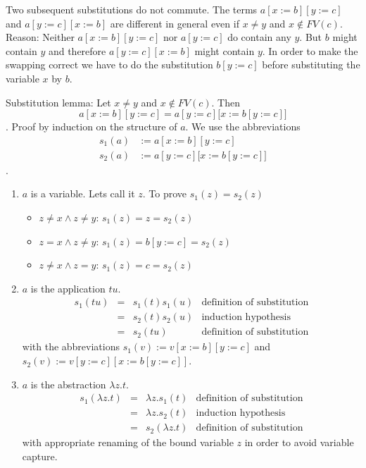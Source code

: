 \documentclass{article}
\begin{document}
Two subsequent substitutions do not commute. The terms $a[x:=b][y:=c]$ and
$a[y:=c][x:=b]$ are different in general even if $x \ne y$ and
$x \notin FV(c)$. Reason: Neither $a[x:=b][y:=c]$ nor $a[y:=c]$ do contain any
$y$. But $b$ might contain $y$ and therefore $a[y:=c][x:=b]$ might contain
$y$. In order to make the swapping correct we have to do the substitution
$b[y:=c]$ before substituting the variable $x$ by $b$.

\begin{theorem} Substitution lemma: Let $x \ne y$ and $x \notin
  FV(c)$. Then $$a[x:=b][y:=c] = a[y:=c]\big[x:= b[y:=c]\big]$$. Proof by
  induction on the structure of $a$. We use the abbreviations
  $$\begin{array}{ll}
      s_1(a) &:= a[x:=b][y:=c] \\
      s_2(a) &:= a[y:=c]\big[x:=b[y:=c]\big]
    \end{array}$$.
  \begin{enumerate}
  \item $a$ is a variable. Lets call it $z$. To prove $s_1(z) = s_2(z)$
    \begin{itemize}
    \item $z \ne x \land z \ne y$: $s_1(z) = z = s_2(z)$
    \item $z = x \land z \ne y$: $s_1(z) = b[y:=c] = s_2(z)$
    \item $z \ne x \land z = y$: $s_1(z) = c = s_2(z)$
    \end{itemize}
  \item $a$ is the application $t u$.
    $$\begin{array}{llll}
        s_1(t u) &=& s_1(t) s_1(u) & \text{definition of substitution}\\
       &=& s_2(t) s_2(u) & \text{induction hypothesis}\\
        &=& s_2(t u) & \text{definition of substitution}
      \end{array}$$
      with the abbreviations $s_1(v) := v[x:=b][y:=c]$ and $s_2(v) :=
      v[y:=c][x:=b[y:=c]]$.
    \item $a$ is the abstraction $\lambda z.t$.
    $$\begin{array}{llll}
        s_1(\lambda z. t) &=& \lambda z. s_1(t)  & \text{definition of substitution}\\
       &=& \lambda z. s_2(t) & \text{induction hypothesis}\\
        &=& s_2(\lambda z.t) & \text{definition of substitution}
      \end{array}$$
      with appropriate renaming of the bound variable $z$ in order to avoid
      variable capture.
  \end{enumerate}
\end{theorem}
\end{document}
